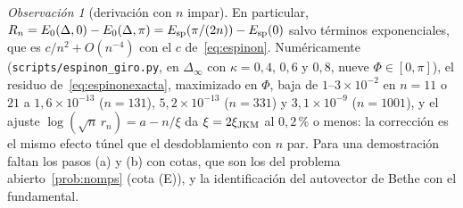 \documentclass[11pt,a4paper]{article}
\theoremstyle{remark}
\newtheorem*{observacion}{Observación}
\begin{document}
\begin{observacion}[derivación con $n$ impar]
En particular, $R_n=E_0(\Delta,0)-E_0(\Delta,\pi)=E_{\rm sp}(\pi/(2n))-E_{\rm sp}(0)$ salvo
términos exponenciales, que es $c/n^2+O(n^{-4})$ con el $c$ de~\eqref{eq:espinon}. Numéricamente
(\texttt{scripts/espinon\_giro.py}, en $\Delta_\infty$ con $\kappa=0{,}4$, $0{,}6$ y $0{,}8$, nueve
$\Phi\in[0,\pi]$), el residuo de~\eqref{eq:espinonexacta}, maximizado en $\Phi$, baja de
$1$--$3\times10^{-2}$ en $n=11$ o $21$ a $1{,}6\times10^{-13}$ ($n=131$), $5{,}2\times10^{-13}$ ($n=331$) y
$3{,}1\times10^{-9}$ ($n=1001$), y el ajuste $\log(\sqrt n\,r_n)=a-n/\xi$ da $\xi=2\xi_{\rm JKM}$ al
$0{,}2$\,\% o menos: la corrección es el mismo efecto túnel que el desdoblamiento con $n$ par. Para
una demostración faltan los pasos (a) y (b) con cotas, que son los del problema
abierto~\ref{prob:nomps} (cota (E)), y la identificación del autovector de Bethe con el
fundamental.
\end{observacion}
\end{document}
